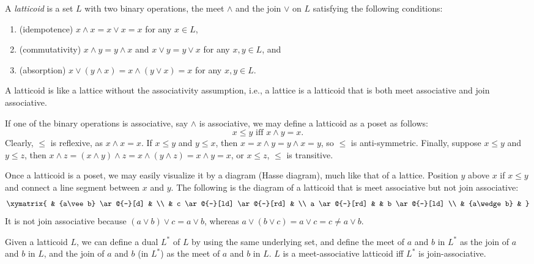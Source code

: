 \documentclass[12pt]{article}
\begin{document}
A \emph{latticoid} is a set $L$ with two binary operations, the meet $\wedge$ and the join $\vee$ on $L$ satisfying the following conditions:
\begin{enumerate}
\item (idempotence) $x\wedge x=x\vee x=x$ for any $x\in L$,
\item (commutativity) $x\wedge y=y\wedge x$ and $x\vee y=y\vee x$ for any $x,y\in L$, and
\item (absorption) $x\vee (y\wedge x)=x\wedge (y\vee x)=x$ for any $x,y\in L$.
\end{enumerate}

A latticoid is like a lattice without the associativity assumption, i.e., a lattice is a latticoid that is both meet associative and join associative.

If one of the binary operations is associative, say $\wedge$ is associative, we may define a latticoid as a poset as follows: $$x\le y\mbox{ iff }x\wedge y=x.$$
Clearly, $\le$ is reflexive, as $x\wedge x=x$.  If $x\le y$ and $y\le x$, then $x=x\wedge y=y\wedge x=y$, so $\le$ is anti-symmetric.  Finally, suppose $x\le y$ and $y\le z$, then $x\wedge z=(x\wedge y)\wedge z=x\wedge (y\wedge z)=x\wedge y=x$, or $x\le z$, $\le$ is transitive.

Once a latticoid is a poset, we may easily visualize it by a diagram (Hasse diagram), much like that of a lattice.  Position $y$ above $x$ if $x\le y$ and connect a line segment between $x$ and $y$.  The following is the diagram of a latticoid that is meet associative but not join associative:
\begin{equation*}
\xymatrix{
& {a\vee b} \ar@{-}[d] & \\
& c \ar@{-}[ld] \ar@{-}[rd] & \\
a \ar@{-}[rd] & & b \ar@{-}[ld] \\
& {a\wedge b} &
}
\end{equation*}
It is not join associative because $(a\vee b)\vee c= a\vee b$, whereas $a\vee (b\vee c)=a\vee c=c\ne a\vee b$.

Given a latticoid $L$, we can define a dual $L^*$ of $L$ by using the same underlying set, and define the meet of $a$ and $b$ in $L^*$ as the join of $a$ and $b$ in $L$, and the join of $a$ and $b$ (in $L^*$) as the meet of $a$ and $b$ in $L$.  $L$ is a meet-associative latticoid iff $L^*$ is join-associative.
\end{document}
